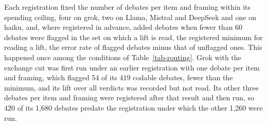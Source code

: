 Each registration fixed the number of debates per item and framing within
its spending ceiling, four on grok, two on Llama, Mistral and DeepSeek and one
on haiku, and, where registered in advance, added debates when fewer than 60
debates were flagged in the set on which a lift is read, the registered
minimum for reading a lift, the error rate of flagged debates minus that of
unflagged ones.
This happened once among the conditions of Table~\ref{tab-routing}. Grok
with the exchange cut was first run under an earlier registration with one
debate per item and framing, which flagged 54 of its 419 codable debates,
fewer than the minimum, and its lift over all verdicts was recorded but not
read. Its other three debates per item and framing were registered after
that result and then run, so 420 of its 1,680 debates predate the
registration under which the other 1,260 were run.
